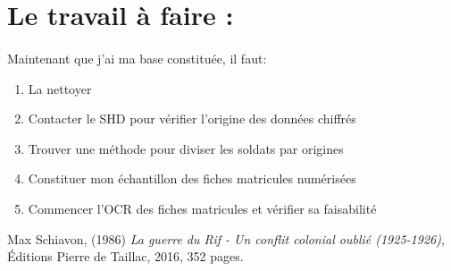 \documentclass[12pt]{article}
\begin{document}
\section{Le travail à faire :}
\paragraph*{}
Maintenant que j'ai ma base constituée, il faut: \begin{enumerate}
\item La nettoyer
\item Contacter le SHD pour vérifier l'origine des données chiffrés 
\item Trouver une méthode pour diviser les soldats par origines 
\item Constituer mon échantillon des fiches matricules numérisées
\item Commencer l'OCR des fiches matricules et vérifier sa faisabilité
\end{enumerate}


\listoffigures

\begin{thebibliography}{1}
Max Schiavon, (1986) \emph{La guerre du Rif - Un conflit colonial oublié (1925-1926)}, Éditions Pierre de Taillac, 2016, 352 pages.
\end{thebibliography}
\end{document}
